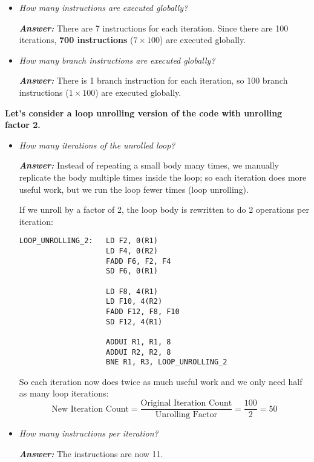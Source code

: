 \begin{itemize}
    
    \item \emph{How many instructions are executed globally?}

    \textcolor{Green3}{\textbf{\emph{Answer:}}} There are 7 instructions for each iteration. Since there are 100 iterations, \textbf{700 instructions} ($7 \times 100$) are executed globally.
    
    
    \item \emph{How many branch instructions are executed globally?}

    \textcolor{Green3}{\textbf{\emph{Answer:}}} There is 1 branch instruction for each iteration, so 100 branch instructions ($1 \times 100$) are executed globally.
\end{itemize}
\textbf{Let's consider a loop unrolling version of the code with unrolling factor 2.}
\begin{itemize}
    \item \emph{How many iterations of the unrolled loop?}

    \textcolor{Green3}{\textbf{\emph{Answer:}}} Instead of repeating a small body many times, we manually replicate the body multiple times inside the loop; so each iteration does more useful work, but we run the loop fewer times (loop unrolling).


    If we unroll by a factor of 2, the loop body is rewritten to do 2 operations per iteration:
    \begin{lstlisting}
LOOP_UNROLLING_2:   LD F2, 0(R1)
                    LD F4, 0(R2)
                    FADD F6, F2, F4
                    SD F6, 0(R1)

                    LD F8, 4(R1)
                    LD F10, 4(R2)
                    FADD F12, F8, F10
                    SD F12, 4(R1)

                    ADDUI R1, R1, 8
                    ADDUI R2, R2, 8
                    BNE R1, R3, LOOP_UNROLLING_2\end{lstlisting}
    So each iteration now does twice as much useful work and we only need half as many loop iterations:
    \begin{equation*}
        \text{New Iteration Count} = \dfrac{\text{Original Iteration Count}}{\text{Unrolling Factor}} = \dfrac{100}{2} = 50
    \end{equation*}
    
    
    \item \emph{How many instructions per iteration?}

    \textcolor{Green3}{\textbf{\emph{Answer:}}} The instructions are now 11.
    

\end{itemize}
